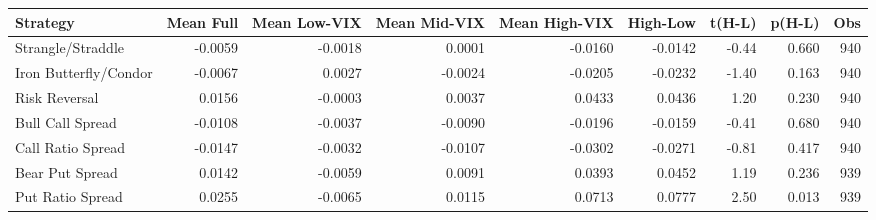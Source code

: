 \begin{tabular}{lrrrrrrrr}
\toprule
Strategy & Mean Full & Mean Low-VIX & Mean Mid-VIX & Mean High-VIX & High-Low & t(H-L) & p(H-L) & Obs \\
\midrule
Strangle/Straddle & -0.0059 & -0.0018 & 0.0001 & -0.0160 & -0.0142 & -0.44 & 0.660 & 940 \\
Iron Butterfly/Condor & -0.0067 & 0.0027 & -0.0024 & -0.0205 & -0.0232 & -1.40 & 0.163 & 940 \\
Risk Reversal & 0.0156 & -0.0003 & 0.0037 & 0.0433 & 0.0436 & 1.20 & 0.230 & 940 \\
Bull Call Spread & -0.0108 & -0.0037 & -0.0090 & -0.0196 & -0.0159 & -0.41 & 0.680 & 940 \\
Call Ratio Spread & -0.0147 & -0.0032 & -0.0107 & -0.0302 & -0.0271 & -0.81 & 0.417 & 940 \\
Bear Put Spread & 0.0142 & -0.0059 & 0.0091 & 0.0393 & 0.0452 & 1.19 & 0.236 & 939 \\
Put Ratio Spread & 0.0255 & -0.0065 & 0.0115 & 0.0713 & 0.0777 & 2.50 & 0.013 & 939 \\
\bottomrule
\end{tabular}
